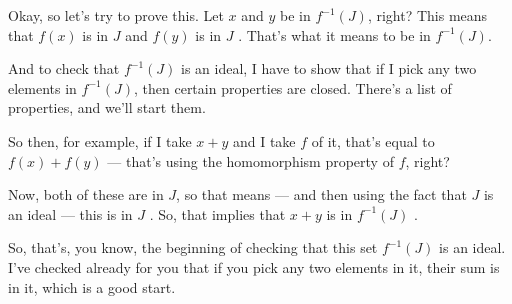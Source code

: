 \begin{speech}[00:10:33 - 00:12:45]
Okay, so let's try to prove this. Let $x$ and $y$ be in $f^{-1}(J)$, right?  This means that $f(x)$ is in $J$ and $f(y)$ is in $J$ . That's what it means to be in $f^{-1}(J)$.

And to check that $f^{-1}(J)$ is an ideal, I have to show that if I pick any two elements in $f^{-1}(J)$, then certain properties are closed. There's a list of properties, and we'll start them.

So then, for example, if I take $x + y$ and I take $f$ of it, that's equal to $f(x) + f(y)$ --- that's using the homomorphism property of $f$, right? 

Now, both of these are in $J$, so that means --- and then using the fact that $J$ is an ideal --- this is in $J$ . So, that implies that $x + y$ is in $f^{-1}(J)$ .

So, that's, you know, the beginning of checking that this set $f^{-1}(J)$ is an ideal. I've checked already for you that if you pick any two elements in it, their sum is in it, which is a good start.
\end{speech}

